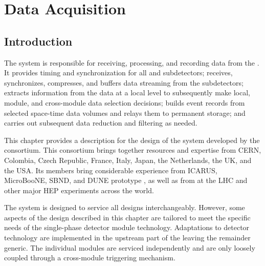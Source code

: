 %
%

\glsresetall

\chapter{Data Acquisition}
\label{ch:sp-daq}

\section{Introduction}
\label{sec:fd-daq:introduction}

The   system is responsible for receiving,
processing, and recording data from the  .
It provides
timing and synchronization for all  and
subdetectors; receives, synchronizes, compresses, and buffers data
streaming from the subdetectors; extracts information from the data at a
local level to subsequently make local, module, and cross-module data
selection decisions; builds event records %
from selected space-time data volumes 
and relays them to permanent storage; and carries out subsequent data
reduction and filtering as needed.

This chapter provides a description for the design of the 
  system developed by the  
 consortium. 
This consortium brings together resources and expertise from CERN,
Colombia, Czech Republic, France, Italy, Japan, the Netherlands, the UK, and the USA. 
Its members bring considerable experience from ICARUS, MicroBooNE,
SBND, and
DUNE prototype , as well as from  at the LHC and other major
HEP experiments across the world.

The system is designed to service all   designs
interchangeably.  However, some aspects of the  design described in
this chapter are tailored to meet the specific needs of the single-phase
detector module technology.  Adaptations to detector technology are
implemented in the upstream part of the  leaving the remainder generic. The
individual modules are serviced independently and are only loosely
coupled through a cross-module triggering mechanism.

